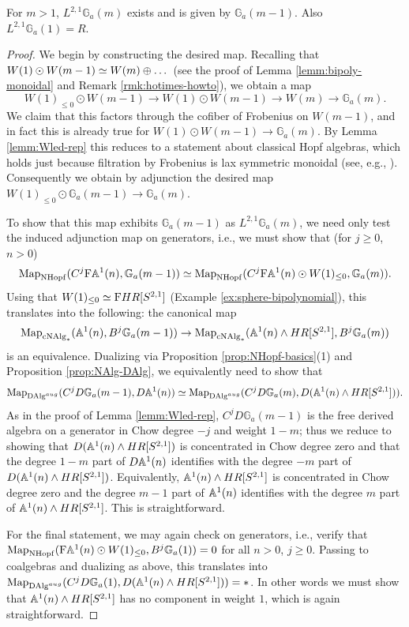 \documentclass{amsart}
\renewcommand{\NB}[1]{}
\numberwithin{proposition}{section}
\numberwithin{equation}{section}
\def\NHopf{\mathrm{NHopf}}
\def\cNAlg{\mathrm{cNAlg}}
\def\DAlg{\mathrm{DAlg}}
\newcommand{\Ga}{{\mathbb{G}_a}}
\def\Free{\mathrm{F}}
\def\hotimes{\odot}
\def\hLoops{L}
\begin{document}
\begin{lemma} \label{lemm:Ga-loops}
For $m > 1$, $\hLoops^{2,1}\Ga(m)$ exists and is given by $\Ga(m-1)$.
Also $\hLoops^{2,1} \Ga(1) = R$.
\end{lemma}
\begin{proof}
We begin by constructing the desired map.
Recalling that $W(1) \hotimes W(m-1) \wequi W(m) \oplus \dots$ (see the proof of Lemma \ref{lemm:bipoly-monoidal} and Remark \ref{rmk:hotimes-howto}), we obtain a map \[ W(1)_{\le 0} \hotimes W(m-1) \to W(1) \hotimes W(m-1) \to W(m) \to \Ga(m). \]
We claim that this factors through the cofiber of Frobenius on $W(m-1)$, and in fact this is already true for $W(1) \hotimes W(m-1) \to \Ga(m)$.
By Lemma \ref{lemm:Wled-rep} this reduces to a statement about classical Hopf algebras, which holds just because filtration by Frobenius is lax symmetric monoidal (see, e.g., \cite[\S2.5.1]{bachmann-wilson}).
Consequently we obtain by adjunction the desired map $W(1)_{\le 0} \hotimes \Ga(m-1) \to \Ga(m)$.

To show that this map exhibits $\Ga(m-1)$ as $\hLoops^{2,1}\Ga(m)$, we need only test the induced adjunction map on generators, i.e., we must show that (for $j \ge 0$, $n>0$) \[ \Map_{\NHopf}(C^j \Free \A^1(n), \Ga(m-1)) \wequi \Map_{\NHopf}(C^j \Free \A^1(n) \hotimes W(1)_{\le 0}, \Ga(m)). \]
Using that $W(1)_{\le 0} \wequi \Free HR[S^{2,1}]$ (Example \ref{ex:sphere-bipolynomial}), this translates into the following: the canonical map \[ \Map_{\cNAlg_*}(\A^1(n), B^j \Ga(m-1)) \to \Map_{\cNAlg_*}(\A^1(n) \wedge HR[S^{2,1}], B^j \Ga(m)) \] is an equivalence.
Dualizing via Proposition \ref{prop:NHopf-basics}(1) and Proposition \ref{prop:NAlg-DAlg}, we equivalently need to show that \[ \Map_{\DAlg^{aug}}(C^j D\Ga(m-1), D\A^1(n)) \wequi \Map_{\DAlg^{aug}}(C^j D\Ga(m), D(\A^1(n) \wedge HR[S^{2,1}])). \]
As in the proof of Lemma \ref{lemm:Wled-rep}, $C^j D\Ga(m-1)$ is the free derived algebra on a generator in Chow degree $-j$ and weight $1-m$; thus we reduce to showing that $D(\mathbb A^1(n) \wedge HR[S^{2,1}])$ is concentrated in Chow degree zero and that the degree $1-m$ part of $D\mathbb A^1(n)$ identifies with the degree $-m$ part of $D(\mathbb A^1(n) \wedge HR[S^{2,1}])$.
Equivalently, $\mathbb A^1(n) \wedge HR[S^{2,1}]$ is concentrated in Chow degree zero and the degree $m-1$ part of $\mathbb A^1(n)$ identifies with the degree $m$ part of $\mathbb A^1(n) \wedge HR[S^{2,1}]$.
This is straightforward.\NB{details?}

For the final statement, we may again check on generators, i.e., verify that $\Map_{\NHopf}(\Free \A^1(n) \hotimes W(1)_{\le 0}, B^j \Ga(1)) = 0$ for all $n > 0$, $j \ge 0$.
Passing to coalgebras and dualizing as above, this translates into $\Map_{\DAlg^{aug}}(C^j D\Ga(1), D(\A^1(n) \wedge HR[S^{2,1}])) = *$.
In other words we must show that $\mathbb A^1(n) \wedge HR[S^{2,1}]$ has no component in weight $1$, which is again straightforward.
\end{proof}
\end{document}
